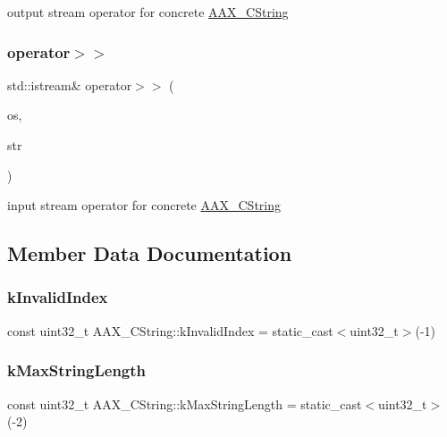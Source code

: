 output stream operator for concrete \mbox{\hyperlink{a01573}{A\+A\+X\+\_\+\+C\+String}} \mbox{\label{a01573_a0aeba574cb25673bf03675a39fb7bbe0}} 
\subsubsection{\texorpdfstring{operator$>$$>$}{operator>>}}
{\footnotesize\ttfamily std\+::istream\& operator$>$$>$ (\begin{DoxyParamCaption}\item[{std\+::istream \&}]{os,  }\item[{\mbox{\hyperlink{a01573}{A\+A\+X\+\_\+\+C\+String}} \&}]{str }\end{DoxyParamCaption})\hspace{0.3cm}{\ttfamily [friend]}}

input stream operator for concrete \mbox{\hyperlink{a01573}{A\+A\+X\+\_\+\+C\+String}} 

\subsection{Member Data Documentation}
\mbox{\label{a01573_afa6319e07e02639611c86e1606867564}} 
\subsubsection{\texorpdfstring{kInvalidIndex}{kInvalidIndex}}
{\footnotesize\ttfamily const uint32\+\_\+t A\+A\+X\+\_\+\+C\+String\+::k\+Invalid\+Index = static\+\_\+cast$<$uint32\+\_\+t$>$(-\/1)\hspace{0.3cm}{\ttfamily [static]}}

\mbox{\label{a01573_aac7fe2ef7191455a685602c9122ce515}} 
\subsubsection{\texorpdfstring{kMaxStringLength}{kMaxStringLength}}
{\footnotesize\ttfamily const uint32\+\_\+t A\+A\+X\+\_\+\+C\+String\+::k\+Max\+String\+Length = static\+\_\+cast$<$uint32\+\_\+t$>$(-\/2)\hspace{0.3cm}{\ttfamily [static]}}

